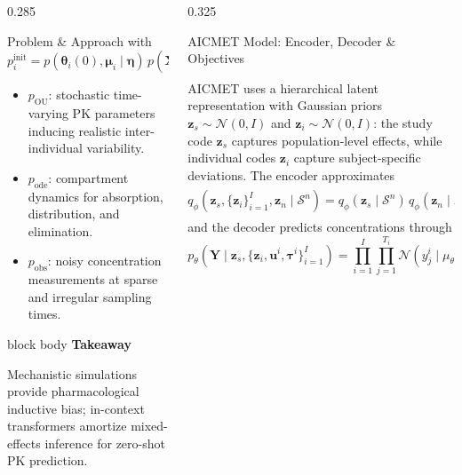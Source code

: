 \documentclass[final]{beamer}
\newcommand{\subhead}[1]{\vspace{0.25em}{\color{FIMText}\bfseries #1}\par\vspace{0.2em}}
\newcommand{\metricbox}[2]{%
  \begin{beamercolorbox}[wd=\linewidth,rounded=true,sep=0.85em]{block body}
    {\color{FIMBlueDark}\bfseries #1}\par
    \vspace{0.2em}
    #2
  \end{beamercolorbox}
}
\begin{document}
\begin{frame}[t]
\begin{columns}[T,totalwidth=\textwidth]
\begin{column}{0.285\textwidth}
\begin{block}{Problem \& Approach}
\vspace{0.1em}
with
\[
p_i^{\mathrm{init}}
=
p(\boldsymbol{\theta}_i(0),\boldsymbol{\mu}_i\mid\boldsymbol{\eta})\,
p(\mathbf X^i(0)),
\qquad
p_i^{\mathrm{sample}}
=
p(\boldsymbol{\tau}^i\mid T_{\mathrm{peak}},T_{\mathrm{half}}).
\]

\vspace{-0.25em}

\begin{itemize}
    \setlength\itemsep{0.1em}
    \item $p_{\mathrm{OU}}$: stochastic time-varying PK parameters inducing realistic inter-individual variability.
    \item $p_{\mathrm{ode}}$: compartment dynamics for absorption, distribution, and elimination.
    \item $p_{\mathrm{obs}}$: noisy concentration measurements at sparse and irregular sampling times.
\end{itemize}

\vspace{0.2em}
\metricbox{Takeaway}{
Mechanistic simulations provide pharmacological inductive bias; in-context transformers amortize mixed-effects inference for zero-shot PK prediction.
}

\end{block}
\end{column}

  \begin{column}{0.325\textwidth}

\begin{block}{AICMET Model: Encoder, Decoder \& Objectives}
\justifying
\small

\subhead{Encoder--decoder model}

AICMET uses a hierarchical latent representation with Gaussian priors
$\mathbf z_s\sim\mathcal N(0,I)$ and $\mathbf z_i\sim\mathcal N(0,I)$:
the study code $\mathbf z_s$ captures population-level effects, while individual codes $\mathbf z_i$ capture subject-specific deviations. The encoder approximates
\[
q_\phi\!\left(
\mathbf z_s,\{\mathbf z_i\}_{i=1}^{I},\mathbf z_n
\mid \mathcal S^n
\right)
=
q_\phi(\mathbf z_s\mid\mathcal S^n)\,
q_\phi(\mathbf z_n\mid\mathcal D^n)
\prod_{i=1}^{I}q_\phi(\mathbf z_i\mid\mathcal D^i),
\]
and the decoder predicts concentrations through
\[
p_\theta(\mathbf Y\mid \mathbf z_s,\{\mathbf z_i,\mathbf u^i,\boldsymbol\tau^i\}_{i=1}^{I})
=
\prod_{i=1}^{I}
\prod_{j=1}^{T_i}
\mathcal N\!\left(
y_j^i
\mid
\mu_\theta(\tau_j^i,\mathbf Z_i),
\sigma_\theta^2(\tau_j^i,\mathbf Z_i)
\right),
\qquad
\mathbf Z_i=(\mathbf z_s,\mathbf z_i,\mathbf u^i).
\]


\end{block}
\end{column}
\end{columns}
\end{frame}
\end{document}
